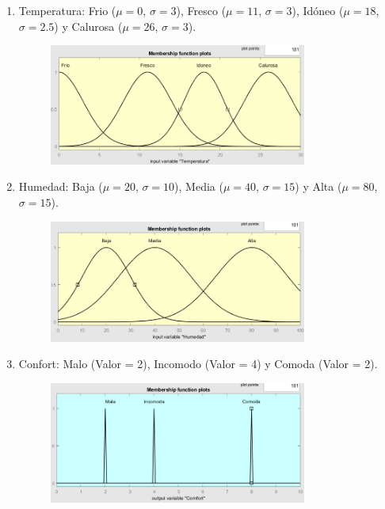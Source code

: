 \documentclass[11pt, letterpaper]{article}
\begin{document}
\begin{enumerate}
	\item Temperatura: Frio ($\mu = 0$, $\sigma = 3$), Fresco ($\mu = 11$, $\sigma = 3$), Idóneo ($\mu = 18$, $\sigma = 2.5$) y Calurosa ($\mu = 26$, $\sigma = 3$).
	\begin{figure}[h]
		\centering
		\includegraphics[width=0.8\textwidth]{IMG/P21.png}
	\end{figure}
	\newpage
	\item Humedad: Baja ($\mu = 20$, $\sigma = 10$), Media ($\mu = 40$, $\sigma = 15$) y Alta ($\mu = 80$, $\sigma = 15$).
	\begin{figure}[h]
		\centering
		\includegraphics[width=0.8\textwidth]{IMG/P22.png}
	\end{figure}
	\item Confort: Malo (Valor = 2), Incomodo (Valor = 4) y Comoda (Valor = 2).
	\begin{figure}[h]
		\centering
		\includegraphics[width=0.8\textwidth]{IMG/P23.png}
	\end{figure}
\end{enumerate}
\end{document}
